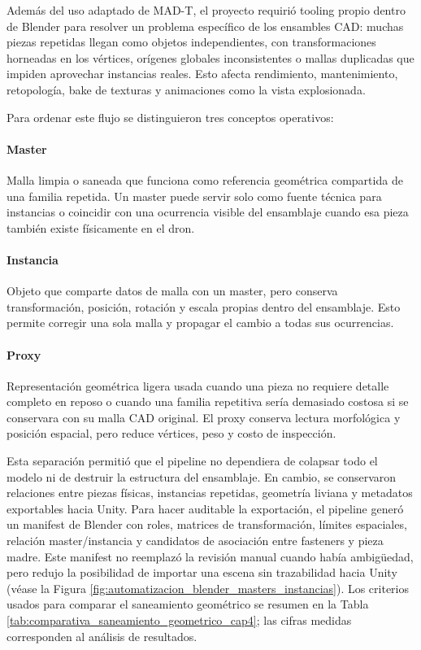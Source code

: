 Además del uso adaptado de MAD-T, el proyecto requirió tooling propio dentro de Blender para resolver un problema específico de los ensambles CAD: muchas piezas repetidas llegan como objetos independientes, con transformaciones horneadas en los vértices, orígenes globales inconsistentes o mallas duplicadas que impiden aprovechar instancias reales. Esto afecta rendimiento, mantenimiento, retopología, bake de texturas y animaciones como la vista explosionada.

Para ordenar este flujo se distinguieron tres conceptos operativos:

\paragraph{Master} Malla limpia o saneada que funciona como referencia geométrica compartida de una familia repetida. Un master puede servir solo como fuente técnica para instancias o coincidir con una ocurrencia visible del ensamblaje cuando esa pieza también existe físicamente en el dron.

\paragraph{Instancia} Objeto que comparte datos de malla con un master, pero conserva transformación, posición, rotación y escala propias dentro del ensamblaje. Esto permite corregir una sola malla y propagar el cambio a todas sus ocurrencias.

\paragraph{Proxy} Representación geométrica ligera usada cuando una pieza no requiere detalle completo en reposo o cuando una familia repetitiva sería demasiado costosa si se conservara con su malla CAD original. El proxy conserva lectura morfológica y posición espacial, pero reduce vértices, peso y costo de inspección.

Esta separación permitió que el pipeline no dependiera de colapsar todo el modelo ni de destruir la estructura del ensamblaje. En cambio, se conservaron relaciones entre piezas físicas, instancias repetidas, geometría liviana y metadatos exportables hacia Unity. Para hacer auditable la exportación, el pipeline generó un manifest de Blender con roles, matrices de transformación, límites espaciales, relación master/instancia y candidatos de asociación entre fasteners y pieza madre. Este manifest no reemplazó la revisión manual cuando había ambigüedad, pero redujo la posibilidad de importar una escena sin trazabilidad hacia Unity (véase la Figura \ref{fig:automatizacion_blender_masters_instancias}). Los criterios usados para comparar el saneamiento geométrico se resumen en la Tabla \ref{tab:comparativa_saneamiento_geometrico_cap4}; las cifras medidas corresponden al análisis de resultados.

